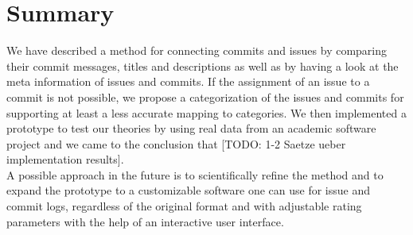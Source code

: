\section{Summary}
\label{sec:summary}
We have described a method for connecting commits and issues by comparing their commit messages, titles and descriptions as well as by having a look at the meta information of issues and commits.
If the assignment of an issue to a commit is not possible, we propose a categorization of the issues and commits for supporting at least a less accurate mapping to categories.
We then implemented a prototype to test our theories by using real data from an academic software project and we came to the conclusion that [TODO: 1-2 Saetze ueber implementation results].\\
A possible approach in the future is to scientifically refine the method and to expand the prototype to a customizable software one can use for issue and commit logs, regardless of the original format and with adjustable rating parameters with the help of an interactive user interface.